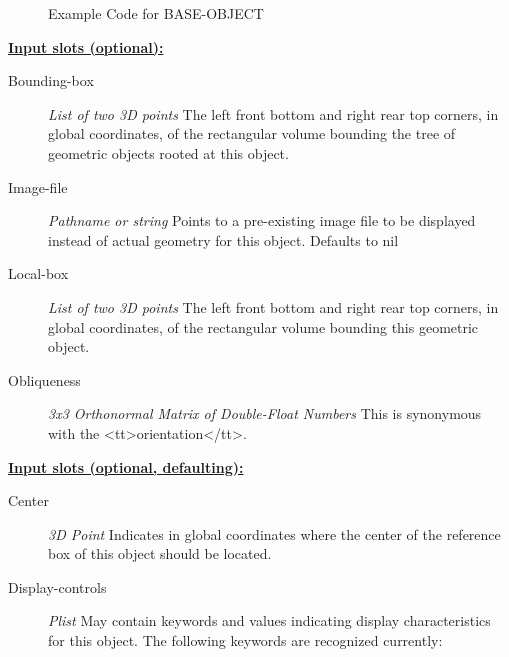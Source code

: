 \documentclass [11pt]{book}
\begin{document}
\begin{itemize}
\begin{figure}
\begin{lrbox}{\boxedverb}
\begin{minipage}{\linewidth}
{\begin{verbatim}
\end{verbatim}}
\end{minipage}
\end{lrbox}
\fbox{\usebox{\boxedverb}}

\caption{Example Code for BASE-OBJECT}

\label{fig:example-code-BASE-OBJECT}

\end{figure}





\textbf{
\underline{Input slots (optional):}}

\begin{description}

\item [Bounding-box]
\emph{List of two 3D points} The left front bottom and right rear top corners, in global coordinates,
of the rectangular volume bounding the tree of geometric objects rooted at this object.


\item [Image-file]
\emph{Pathname or string} Points to a pre-existing image file to be displayed instead of actual geometry for this object. Defaults to nil


\item [Local-box]
\emph{List of two 3D points} The left front bottom and right rear top corners, in global coordinates,
of the rectangular volume bounding this geometric object.


\item [Obliqueness]
\emph{3x3 Orthonormal Matrix of Double-Float Numbers} This is synonymous with the <tt>orientation</tt>.


\end{description}






\textbf{
\underline{Input slots (optional, defaulting):}}

\begin{description}

\item [Center]
\emph{3D Point} Indicates in global coordinates where the center of the reference
box of this object should be located.


\item [Display-controls]
\emph{Plist} May contain keywords and values indicating display characteristics for
this object. The following keywords are recognized currently:


\end{description}
\end{itemize}
\end{document}
